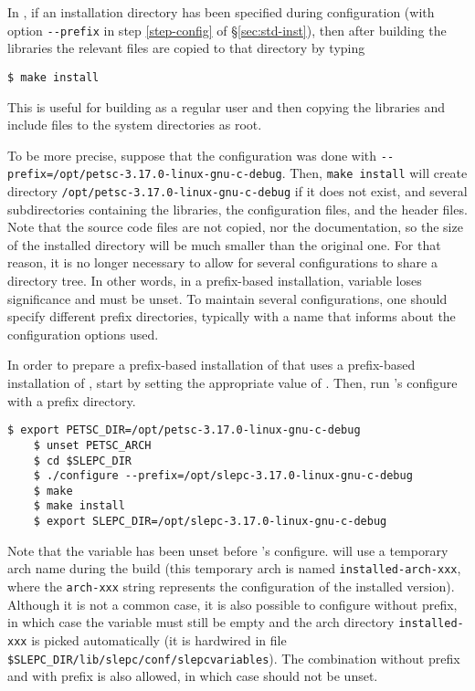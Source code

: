 In \petsc, if an installation directory has been specified during configuration (with option \Verb!--prefix! in step \ref{step-config} of \S\ref{sec:std-inst}), then after building the libraries the relevant files are copied to that directory by typing
	\begin{Verbatim}[fontsize=\small]
	$ make install
	\end{Verbatim}
	This is useful for building as a regular user and then copying the libraries and include files to the system directories as root.

To be more precise, suppose that the configuration was done with \texttt{-{}-prefix=/opt/petsc-3.17.0-linux-gnu-c-debug}. Then, \texttt{make install} will create directory \texttt{/opt/petsc-3.17.0-linux-gnu-c-debug} if it does not exist, and several subdirectories containing the libraries, the configuration files, and the header files. Note that the source code files are not copied, nor the documentation, so the size of the installed directory will be much smaller than the original one. For that reason, it is no longer necessary to allow for several configurations to share a directory tree. In other words, in a prefix-based installation, variable  loses significance and must be unset. To maintain several configurations, one should specify different prefix directories, typically with a name that informs about the configuration options used.

In order to prepare a prefix-based installation of \slepc that uses a prefix-based installation of \petsc, start by setting the appropriate value of . Then, run \slepc's configure with a prefix directory.
	\begin{Verbatim}[fontsize=\small,numbers=none]
	$ export PETSC_DIR=/opt/petsc-3.17.0-linux-gnu-c-debug
	$ unset PETSC_ARCH
	$ cd $SLEPC_DIR
	$ ./configure --prefix=/opt/slepc-3.17.0-linux-gnu-c-debug
	$ make
	$ make install
	$ export SLEPC_DIR=/opt/slepc-3.17.0-linux-gnu-c-debug
	\end{Verbatim}
Note that the variable  has been unset before \slepc's configure. \slepc will use a temporary arch name during the build (this temporary arch is named \texttt{installed-arch-xxx}, where the \texttt{arch-xxx} string represents the configuration of the installed \petsc version). Although it is not a common case, it is also possible to configure \slepc without prefix, in which case the  variable must still be empty and the arch directory \texttt{installed-xxx} is picked automatically (it is hardwired in file \texttt{\$SLEPC\_DIR/lib/slepc/conf/slepcvariables}). The combination \petsc without prefix and \slepc with prefix is also allowed, in which case  should not be unset.

